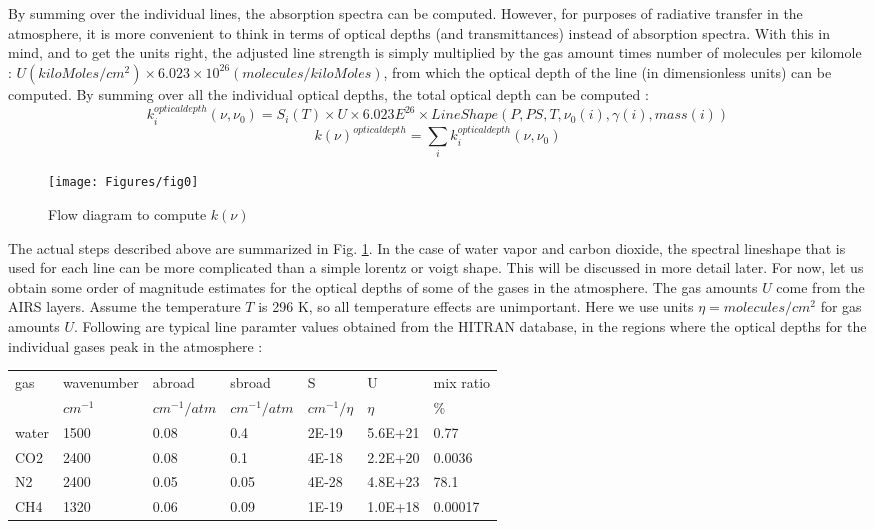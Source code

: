 \documentclass[11pt]{article}
\begin{document}
By summing over the individual lines, the absorption spectra can be 
computed. However, for purposes of radiative transfer in the atmosphere, 
it is more convenient to think in terms of optical depths (and 
transmittances) instead of absorption spectra. With this in mind, and to 
get the units right, the adjusted line strength is simply multiplied by 
the gas amount times number of molecules per kilomole : 
$U (kiloMoles/cm^{2}) \times 6.023 \times 10^{26} (molecules/kiloMoles)$,
from which the optical depth of the line 
(in dimensionless units) can be computed. By summing over all the 
individual optical depths, the total optical depth can be computed : 
\[
k_{i}^{optical depth}(\nu,\nu_{0}) = S_{i}(T) \times U 
\times 6.023E^{26} \times LineShape(P, PS, T, \nu_{0}(i), \gamma(i), mass(i))
\]
\[ 
k(\nu)^{optical depth} = \sum_{i} k_{i}^{optical depth}(\nu,\nu_{0})
\] 

\begin{figure}[h]
  \begin{center}\texttt{[image: Figures/fig0]}\end{center}
  \caption[Computing absorption spectra]{Flow diagram to compute $k(\nu)$}
  \label{fig:easy}
\end{figure}

The actual steps described above are summarized in Fig. \ref{fig:easy}. 
In the case of 
water vapor  and carbon dioxide, the spectral lineshape that is used for 
each line can be more complicated than a simple lorentz or voigt shape. 
This will be discussed in more detail later. For now, let us obtain some 
order of magnitude estimates for the optical depths of some of the gases 
in the atmosphere. The gas amounts $U$ come from the AIRS layers. Assume 
the temperature $T$ is 296 K, so all temperature effects are unimportant.
Here we use units $\eta = molecules/cm^{2}$ for gas amounts $U$. Following
are typical line paramter values obtained from the HITRAN database, in
the regions where the optical depths for the individual gases peak in
the atmosphere : 

\begin{longtable}{lllllll} 
\hline
\hline
gas & wavenumber & abroad         & sbroad       & S & U & mix ratio \\
   & $cm^{-1}$  & $cm^{-1}/atm$ & $cm^{-1}/atm$ &$cm^{-1}/\eta$ & $\eta$ &\%\\ 
\hline
\hline
water & 1500 & 0.08 & 0.4  & 2E-19 & 5.6E+21 & 0.77    \\
CO2   & 2400 & 0.08 & 0.1  & 4E-18 & 2.2E+20 & 0.0036  \\
N2    & 2400 & 0.05 & 0.05 & 4E-28 & 4.8E+23 & 78.1    \\
CH4   & 1320 & 0.06 & 0.09 & 1E-19 & 1.0E+18 & 0.00017 \\
\hline
\hline
\end{longtable} 
\end{document}
